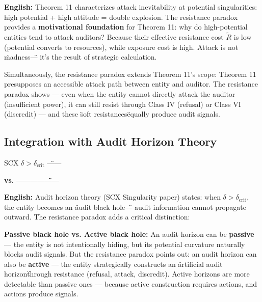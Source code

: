 \documentclass[12pt,a4paper]{article}
\theoremstyle{remark}
\begin{document}
\vspace{4pt}
\noindent
\textbf{English:} Theorem 11 characterizes attack inevitability at potential singularities: high potential + high attitude = double explosion. The resistance paradox provides a \textbf{motivational foundation} for Theorem 11: why do high-potential entities tend to attack auditors? Because their effective resistance cost $ \tilde{R} $ is low (potential converts to resources), while exposure cost is high. Attack is not \"madness\" — it's the result of strategic calculation.

Simultaneously, the resistance paradox extends Theorem 11's scope: Theorem 11 presupposes an accessible attack path between entity and auditor. The resistance paradox shows — even when the entity cannot directly attack the auditor (insufficient power), it can still resist through Class IV (refusal) or Class VI (discredit) — and these \"soft resistances\" equally produce audit signals.

\subsection{}
\subsection{Integration with Audit Horizon Theory}

\noindent
\textbf{} SCX $ \delta > \delta_{\mathrm{crit}} $ \"\"——

\textbf{ vs. } \textbf{}——\textbf{}——\"\"——

\vspace{4pt}
\noindent
\textbf{English:} Audit horizon theory (SCX Singularity paper) states: when $ \delta > \delta_{\mathrm{crit}} $, the entity becomes an \"audit black hole\" — audit information cannot propagate outward. The resistance paradox adds a critical distinction:

\textbf{Passive black hole vs. Active black hole:} An audit horizon can be \textbf{passive} — the entity is not intentionally hiding, but its potential curvature naturally blocks audit signals. But the resistance paradox points out: an audit horizon can also be \textbf{active} — the entity strategically constructs an \"artificial audit horizon\" through resistance (refusal, attack, discredit). Active horizons are more detectable than passive ones — because active construction requires actions, and actions produce signals.

\end{document}
